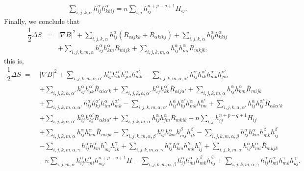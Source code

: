 \documentclass[leqno,11pt]{amsart}
\theoremstyle{plain}
\theoremstyle{definition}
\numberwithin{equation}{section}
\begin{document}
\begin{eqnarray*}
\sum_{i,j,k,\alpha}h_{ij}^{\alpha}h_{kkij}^{\alpha}=n\sum_{i,j}h_{ij}^{n+p-q+1}H_{ij}.
\end{eqnarray*}
Finally, we conclude that
\begin{eqnarray*}
\dfrac{1}{2}\Delta S&=&|\nabla B|^2+\sum_{i,j,k,\alpha}h_{ij}^{\alpha}(\overline{R}_{\alpha ijkk}+\overline{R}_{\alpha kikj})+\sum_{i,j,k,\alpha}h_{ij}^{\alpha}h_{kkij}^{\alpha}\\&&+\sum_{i,j,k,m,\alpha}h_{ij}^{\alpha}h_{km}^{\alpha}R_{mijk}+\sum_{i,j,k,m,\alpha}h_{ij}^{\alpha}h_{mi}^{\alpha}R_{mkjk},
\end{eqnarray*}
this is, 
$$
\begin{aligned}
\dfrac{1}{2}\Delta S \;=\;& |\nabla B|^2
   + \sum_{i,j,k,m,\alpha,\alpha'} h_{ij}^{\alpha}h_{ik}^{\alpha'}h_{jm}^{\alpha}h_{mk}^{\alpha'}
   - \sum_{i,j,k,m,\alpha,\alpha'} h_{ij}^{\alpha}h_{ik}^{\alpha'}h_{mk}^{\alpha}h_{jm}^{\alpha'} \\[6pt]
 &+ \sum_{i,j,k,\alpha,\alpha'} h_{ij}^{\alpha}h_{jk}^{\alpha'}\overline{R}_{\alpha i\alpha' k}
   + \sum_{i,j,k,\alpha,\alpha'} h_{ij}^{\alpha}h_{kk}^{\alpha'}\overline{R}_{\alpha ij \alpha'}
   + \sum_{i,j,k,m,\alpha} h_{ij}^{\alpha}h_{km}^{\alpha}\overline{R}_{mijk} \\[6pt]
 &+ \sum_{i,j,k,m,\alpha,\alpha'} h_{ij}^{\alpha}h_{kj}^{\alpha'}h_{im}^{\alpha}h_{mk}^{\alpha'}
   - \sum_{i,j,k,m,\alpha,\alpha'} h_{ij}^{\alpha}h_{kj}^{\alpha'}h_{mk}^{\alpha}h_{im}^{\alpha'}
   + \sum_{i,j,k,\alpha,\alpha'} h_{ij}^{\alpha}h_{ij}^{\alpha'}\overline{R}_{\alpha k\alpha' k} \\[6pt]
 &+ \sum_{i,j,k,\alpha,\alpha'} h_{ij}^{\alpha}h_{kj}^{\alpha'}\overline{R}_{\alpha ki \alpha'}
   + \sum_{i,j,k,m,\alpha} h_{ij}^{\alpha}h_{jm}^{\alpha}\overline{R}_{mkik}
   + n\sum_{i,j} h_{ij}^{n+p-q+1}H_{ij} \\[6pt]
 &+ \sum_{i,j,k,m,\alpha} h_{ij}^{\alpha}h_{km}^{\alpha}\overline{R}_{mijk}
   + \sum_{i,j,k,m,\alpha,\beta} h_{ij}^{\alpha}h_{km}^{\alpha}h_{mj}^{\beta}h_{ik}^{\beta}
   - \sum_{i,j,k,m,\alpha,\beta} h_{ij}^{\alpha}h_{km}^{\alpha}h_{mk}^{\beta}h_{ij}^{\beta} \\[6pt]
 &- \sum_{i,j,k,m,\alpha,\gamma} h_{ij}^{\alpha}h_{km}^{\alpha}h_{mj}^{\gamma}h_{ik}^{\gamma}
   + \sum_{i,j,k,m,\alpha,\gamma} h_{ij}^{\alpha}h_{km}^{\alpha}h_{mk}^{\gamma}h_{ij}^{\gamma}
   + \sum_{i,j,k,m,\alpha} h_{ij}^{\alpha}h_{mi}^{\alpha}\overline{R}_{mkjk} \\[6pt]
 &- n\sum_{i,j,m,\alpha} h_{ij}^{\alpha}h_{mi}^{\alpha}h_{mj}^{n+p-q+1}H
   - \sum_{i,j,k,m,\alpha,\beta} h_{ij}^{\alpha}h_{mi}^{\alpha}h_{mk}^{\beta}h_{kj}^{\beta}
   + \sum_{i,j,k,m,\alpha,\gamma} h_{ij}^{\alpha}h_{mi}^{\alpha}h_{mk}^{\gamma}h_{kj}^{\gamma}.
\end{aligned}
$$
\end{document}
